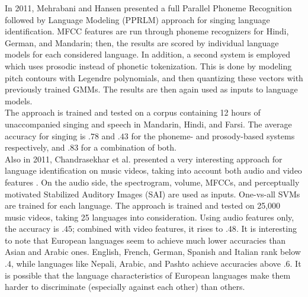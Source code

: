 In 2011, Mehrabani and Hansen presented a full Parallel Phoneme Recognition followed by Language Modeling (PPRLM) approach for singing language identification. MFCC features are run through phoneme recognizers for Hindi, German, and Mandarin; then, the results are scored by individual language models for each considered language. In addition, a second system is employed which uses prosodic instead of phonetic tokenization. This is done by modeling pitch contours with Legendre polynomials, and then quantizing these vectors with previously trained GMMs. The results are then again used as inputs to language models.\\
The approach is trained and tested on a corpus containing 12 hours of unaccompanied singing and speech in Mandarin, Hindi, and Farsi. The average accuracy for singing is $.78$ and $.43$ for the phoneme- and prosody-based systems respectively, and $.83$ for a combination of both.\\

Also in 2011, Chandrasekhar et al. presented a very interesting approach for language identification on music videos, taking into account both audio and video features \cite {chandrasekhar}. On the audio side, the spectrogram, volume, MFCCs, and perceptually motivated Stabilized Auditory Images (SAI) are used as inputs. One-vs-all SVMs are trained for each language. The approach is trained and tested on 25,000 music videos, taking 25 languages into consideration. Using audio features only, the accuracy is $.45$; combined with video features, it rises to $.48$. It is interesting to note that European languages seem to achieve much lower accuracies than Asian and Arabic ones. English, French, German, Spanish and Italian rank below $.4$, while languages like Nepali, Arabic, and Pashto achieve accuracies above $.6$. It is possible that the language characteristics of European languages make them harder to discriminate (especially against each other) than others.

